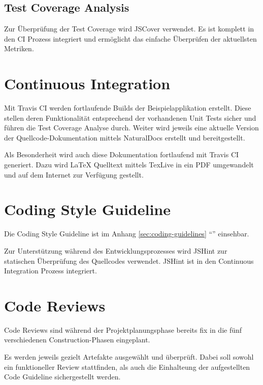 \subsection{Test Coverage Analysis}
Zur Überprüfung der Test Coverage wird JSCover \cite{JSCover} verwendet. Es ist komplett in den \gls{CI} Prozess integriert und ermöglicht das einfache Überprüfen der aktuellsten Metriken.


\section{Continuous Integration}
\label{sec:continuousintegration}

Mit Travis CI werden fortlaufende Builds der Beispielapplikation erstellt. Diese stellen deren Funktionalität entsprechend der vorhandenen Unit Tests sicher und führen die Test Coverage Analyse durch.
Weiter wird jeweils eine aktuelle Version der Quellcode-Dokumentation mittels NaturalDocs erstellt und bereitgestellt.

Als Besonderheit wird auch diese Dokumentation fortlaufend mit Travis CI generiert. Dazu wird LaTeX Quelltext mittels TexLive in ein PDF umgewandelt und auf dem Internet zur Verfügung gestellt.

\section{Coding Style Guideline}
Die Coding Style Guideline ist im Anhang \ref{sec:coding-guidelines} ``'' einsehbar.

Zur Unterstützung während des Entwicklungsprozesses wird JSHint \cite{JSHint} zur statischen Überprüfung des Quellcodes verwendet. JSHint ist in den Continuous Integration Prozess integriert.


\section{Code Reviews}
Code Reviews sind während der Projektplanungsphase bereits fix in die fünf verschiedenen Construction-Phasen eingeplant.

Es werden jeweils gezielt Artefakte ausgewählt und überprüft. Dabei soll sowohl ein funktioneller Review stattfinden, als auch die Einhalteung der aufgestellten Code Guideline sichergestellt werden.